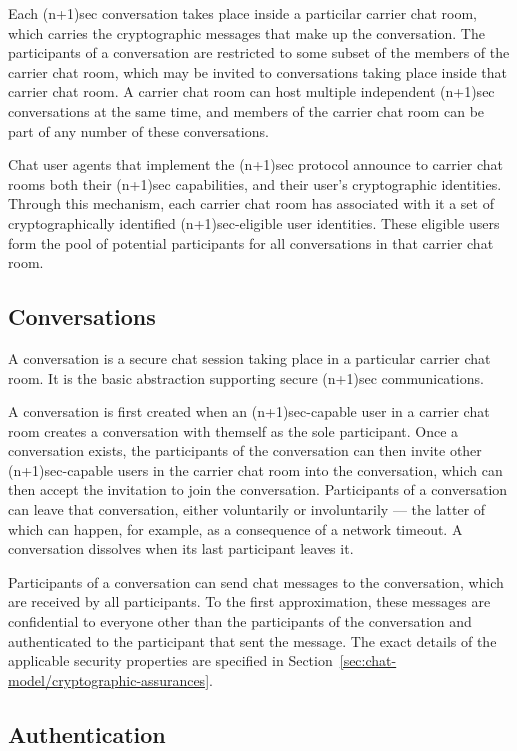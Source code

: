\documentclass{article}
\begin{document}
Each (n+1)sec conversation takes place inside a particilar carrier chat room, which carries the cryptographic messages that make up the conversation.
The participants of a conversation are restricted to some subset of the members of the carrier chat room, which may be invited to conversations taking place inside that carrier chat room.
A carrier chat room can host multiple independent (n+1)sec conversations at the same time, and members of the carrier chat room can be part of any number of these conversations.

Chat user agents that implement the (n+1)sec protocol announce to carrier chat rooms both their (n+1)sec capabilities, and their user's cryptographic identities.
Through this mechanism, each carrier chat room has associated with it a set of cryptographically identified (n+1)sec-eligible user identities.
These eligible users form the pool of potential participants for all conversations in that carrier chat room.


\subsection{Conversations}
\label{sec:chat-model/conversations}

A conversation is a secure chat session taking place in a particular carrier chat room.
It is the basic abstraction supporting secure (n+1)sec communications.

A conversation is first created when an (n+1)sec-capable user in a carrier chat room creates a conversation with themself as the sole participant.
Once a conversation exists, the participants of the conversation can then invite other (n+1)sec-capable users in the carrier chat room into the conversation, which can then accept the invitation to join the conversation.
Participants of a conversation can leave that conversation, either voluntarily or involuntarily --- the latter of which can happen, for example, as a consequence of a network timeout.
A conversation dissolves when its last participant leaves it.

Participants of a conversation can send chat messages to the conversation, which are received by all participants.
To the first approximation, these messages are confidential to everyone other than the participants of the conversation and authenticated to the participant that sent the message.
The exact details of the applicable security properties are specified in Section~\ref{sec:chat-model/cryptographic-assurances}.


\subsection{Authentication}
\label{sec:chat-model/authentication}
\end{document}
